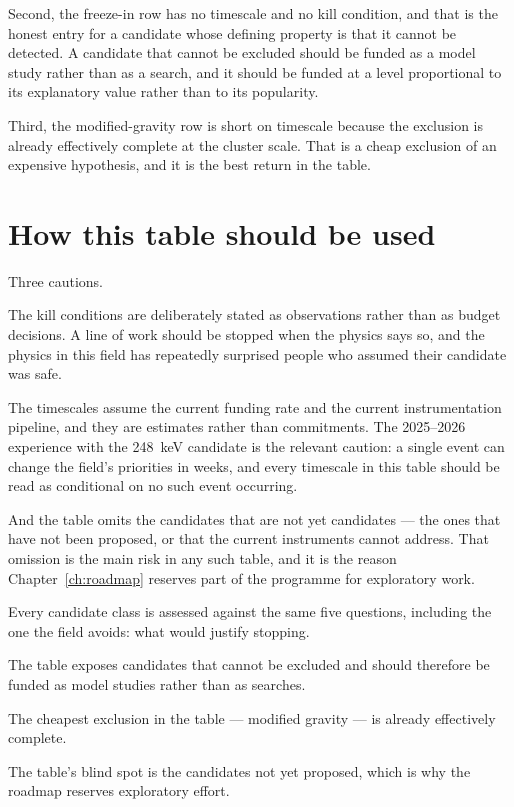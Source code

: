 Second, the freeze-in row has no timescale and no kill condition, and that
is the honest entry for a candidate whose defining property is that it
cannot be detected. A candidate that cannot be excluded should be funded as
a model study rather than as a search, and it should be funded at a level
proportional to its explanatory value rather than to its popularity.

Third, the modified-gravity row is short on timescale because the exclusion
is already effectively complete at the cluster scale. That is a cheap
exclusion of an expensive hypothesis, and it is the best return in the
table.

\section{How this table should be used}Three cautions.

The kill conditions are deliberately stated as observations rather than as
budget decisions. A line of work should be stopped when the physics says
so, and the physics in this field has repeatedly surprised people who
assumed their candidate was safe.

The timescales assume the current funding rate and the current
instrumentation pipeline, and they are estimates rather than
commitments. The 2025--2026 experience with the 248~keV candidate is the
relevant caution: a single event can change the field's priorities in
weeks, and every timescale in this table should be read as conditional on
no such event occurring.

And the table omits the candidates that are not yet candidates --- the ones
that have not been proposed, or that the current instruments cannot address.
That omission is the main risk in any such table, and it is the reason
Chapter~\ref{ch:roadmap} reserves part of the programme for
exploratory work.

\begin{keytakeaways}
\item Every candidate class is assessed against the same five questions,
including the one the field avoids: what would justify stopping.
\item The table exposes candidates that cannot be excluded and should
therefore be funded as model studies rather than as searches.
\item The cheapest exclusion in the table --- modified gravity --- is already
effectively complete.
\item The table's blind spot is the candidates not yet proposed, which is
why the roadmap reserves exploratory effort.
\end{keytakeaways}
